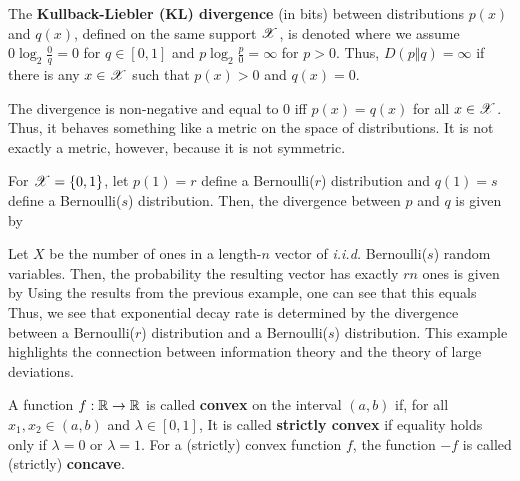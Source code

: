 \documentclass[letterpaper,10pt,english]{article}
\begin{document}
\begin{defn}
The \textbf{Kullback-Liebler (KL) divergence} (in bits) between distributions $p(x)$ and $q(x)$, 
defined on the same support $\mathscr{X}$, is denoted 
where we assume $0\log_2\frac{0}{q} = 0$ for $q \in [0,1]$ and $p\log_2\frac{p}{0} = \infty$ for $p > 0$. 
Thus, $D(p \Vert q) = \infty$ if there is any $x \in \mathscr{X}$ such that $p(x)>0$ and $q(x)=0$.
\end{defn}  
\begin{rem}
The divergence is non-negative and equal to $0$ iff $p(x) = q(x)$ for all $x \in \mathscr{X}$. 
Thus, it behaves something like a metric on the space of distributions. 
It is not exactly a metric, however, because it is not symmetric.
\end{rem}
\begin{exmp}
For $\mathscr{X} = \left\{0,1\right\}$, let $p(1) = r$ define a Bernoulli($r$) distribution and $q(1) = s$ define a Bernoulli($s$) distribution. 
Then, the divergence between $p$ and $q$ is given by 
\end{exmp}
\begin{exmp} 
Let $X$ be the number of ones in a length-$n$ vector of \emph{i.i.d.} Bernoulli($s$) random variables. 
Then, the probability the resulting vector has exactly $rn$ ones is given by
Using the results from the previous example, one can see that this equals
Thus, we see that exponential decay rate is determined by the divergence between a Bernoulli($r$) distribution and a Bernoulli($s$) distribution. 
This example highlights the connection between information theory and the theory of large deviations.
\end{exmp}

\begin{defn}
A function $f: \mathbb{R} \to \mathbb{R}$ is called \textbf{convex} on the interval $(a, b)$ if, for all $x_1, x_2 \in (a,b)$ and $\lambda \in [0,1]$,
It is called \textbf{strictly convex} if equality holds only if $\lambda = 0$ or $\lambda = 1$. 
For a (strictly) convex function $f$, the function $-f$ is called (strictly) \textbf{concave}. 
\end{defn} 
\end{document}
